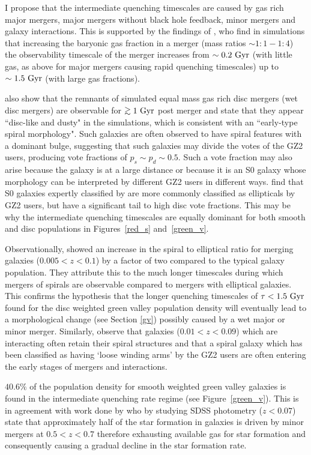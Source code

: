 I propose that the intermediate quenching timescales are caused by gas rich major mergers, major mergers without black hole feedback, minor mergers and galaxy interactions. This is supported by the findings of \citet{Lotz11}, who find in simulations that increasing the baryonic gas fraction in a merger (mass ratios $\sim 1:1-1:4$) the observability timescale of the merger increases from $\sim0.2~\rm{Gyr}$ (with little gas, as above for major mergers causing rapid quenching timescales) up to $\sim1.5~\rm{Gyr}$ (with large gas fractions). 

\citet{lotz08b} also show that the remnants of simulated equal mass gas rich disc mergers (wet disc mergers) are observable for $\gtrsim1~\rm{Gyr}$ post merger and state that they appear ``disc-like and dusty" in the simulations, which is consistent with an ``early-type spiral morphology".  Such galaxies are often observed to have spiral features with a dominant bulge, suggesting that such galaxies may divide the votes of the GZ2 users, producing vote fractions of $p_s \sim p_d \sim 0.5$. Such a vote fraction may also arise because the galaxy is at a large distance or because it is an S0 galaxy whose morphology can be interpreted by different GZ2 users in different ways. \citet{GZ2} find that S0 galaxies expertly classified by \citet{nair10} are more commonly classified as ellipticals by GZ2 users, but have a significant tail to high disc vote fractions. This may be why the intermediate quenching timescales are equally dominant for both smooth and disc populations in Figures~\ref{red_s} and~\ref{green_v}. 

 Observationally, \citet{Darg10a} showed an increase in the spiral to elliptical ratio for merging galaxies ($0.005 < z < 0.1$) by a factor of two compared to the typical galaxy population. They attribute this to the much longer timescales during which mergers of spirals are observable compared to mergers with elliptical galaxies. This confirms the hypothesis that the longer quenching timescales of $\tau < 1.5 ~\rm{Gyr}$ found for the disc weighted green valley population density will eventually lead to a morphological change (see Section \ref{gv}) possibly caused by a wet major or minor merger. Similarly, \citet{Casteels13} observe that galaxies ($0.01 < z < 0.09$) which are interacting often retain their spiral structures and that a spiral galaxy which has been classified as having `loose winding arms' by the GZ2 users are often entering the early stages of mergers and interactions.

$40.6\%$ of the population density for smooth weighted green valley galaxies is found in the intermediate quenching rate regime (see Figure~\ref{green_v}). This is in agreement with work done by \citet{kaviraj14a, kaviraj14b} who by studying SDSS photometry ($z<0.07$) state that approximately half of the star formation in galaxies is driven by minor mergers at $0.5 < z < 0.7$ therefore exhausting available gas for star formation and consequently causing a gradual decline in the star formation rate. 

